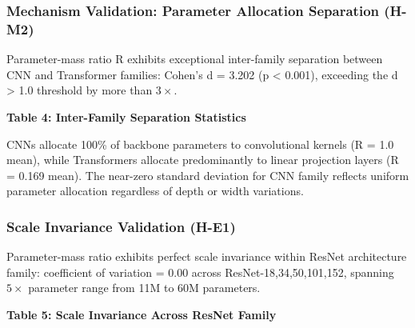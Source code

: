 \subsubsection{Mechanism Validation: Parameter Allocation Separation (H-M2)}

Parameter-mass ratio R exhibits exceptional inter-family separation between CNN and Transformer families: Cohen's d = 3.202 (p < 0.001), exceeding the d > 1.0 threshold by more than $3\times$.

\textbf{Table 4: Inter-Family Separation Statistics}

\begin{table}[htbp]
\centering
{}
\end{table}

CNNs allocate 100\% of backbone parameters to convolutional kernels (R = 1.0 mean), while Transformers allocate predominantly to linear projection layers (R = 0.169 mean). The near-zero standard deviation for CNN family reflects uniform parameter allocation regardless of depth or width variations.

\subsubsection{Scale Invariance Validation (H-E1)}

Parameter-mass ratio exhibits perfect scale invariance within ResNet architecture family: coefficient of variation = 0.00 across ResNet-{18,34,50,101,152}, spanning $5\times$ parameter range from 11M to 60M parameters.

\textbf{Table 5: Scale Invariance Across ResNet Family}

\begin{table}[htbp]
\centering
{}
\end{table}

